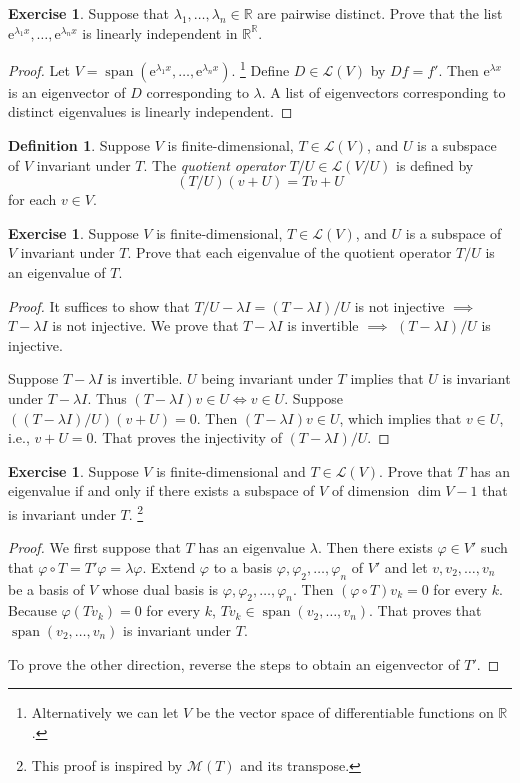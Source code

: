 \documentclass{tufte-handout}
\theoremstyle{plain} %
\theoremstyle{definition}
\newtheorem{defn}[thm]{Definition}
\newtheorem{exer}[thm]{Exercise}
\theoremstyle{remark}
\renewcommand{\phi}{\varphi}
\newcommand{\R}{\mathbb{R}}
\renewcommand{\L}{\mathcal{L}}
\newcommand{\M}{\mathcal{M}}
\newcommand{\e}{\mathrm{e}}
\DeclareMathOperator{\spn}{span}
\begin{document}
\begin{exer}
	Suppose that $\lambda_1,\dots,\lambda_n\in\R$ are pairwise distinct. Prove that the list $\e^{\lambda_1x},\dots,\e^{\lambda_nx}$ is linearly independent in $\R^\R$.
\end{exer}
\begin{proof}
	Let $V=\spn(\e^{\lambda_1x},\dots,\e^{\lambda_nx})$.%
	\footnote{Alternatively we can let $V$ be the vector space of differentiable functions on $\R$.}
	Define $D\in\L(V)$ by $Df=f'$. Then $\e^{\lambda x}$ is an eigenvector of $D$ corresponding to $\lambda$. A list of eigenvectors corresponding to distinct eigenvalues is linearly independent.
\end{proof}

\begin{defn}
	Suppose $V$ is finite-dimensional, $T\in\L(V)$, and $U$ is a subspace of $V$ invariant under $T$. The \emph{quotient operator} $T/U\in\L(V/U)$ is defined by
	\[(T/U)(v+U)=Tv+U\]
	for each $v\in V$.
\end{defn}

\begin{exer}
	Suppose $V$ is finite-dimensional, $T\in\L(V)$, and $U$ is a subspace of $V$ invariant under $T$. Prove that each eigenvalue of the quotient operator $T/U$ is an eigenvalue of $T$.
\end{exer}
\begin{proof}
	It suffices to show that $T/U-\lambda I=(T-\lambda I)/U$ is not injective $\implies$ $T-\lambda I$ is not injective. We prove that $T-\lambda I$ is invertible $\implies$ $(T-\lambda I)/U$ is injective.

	Suppose $T-\lambda I$ is invertible. $U$ being invariant under $T$ implies that $U$ is invariant under $T-\lambda I$. Thus $(T-\lambda I)v\in U\iff v\in U$. Suppose $((T-\lambda I)/U)(v+U)=0$. Then $(T-\lambda I)v\in U$, which implies that $v\in U$, i.e., $v+U=0$. That proves the injectivity of $(T-\lambda I)/U$.
\end{proof}

\begin{exer}
	Suppose $V$ is finite-dimensional and $T\in\L(V)$. Prove that $T$ has an eigenvalue if and only if there exists a subspace of $V$ of dimension $\dim V-1$ that is invariant under $T$.%
	\footnote{This proof is inspired by $\M(T)$ and its transpose.}
\end{exer}
\begin{proof}
	We first suppose that $T$ has an eigenvalue $\lambda$. Then there exists $\phi\in V'$ such that $\phi\circ T=T'\phi=\lambda\phi$. Extend $\phi$ to a basis $\phi,\phi_2,\dots,\phi_n$ of $V'$ and let $v,v_2,\dots,v_n$ be a basis of $V$ whose dual basis is $\phi,\phi_2,\dots,\phi_n$. Then $(\phi\circ T)v_k=0$ for every $k$. Because $\phi(T v_k)=0$ for every $k$, $Tv_k\in\spn(v_2,\dots,v_n)$. That proves that $\spn(v_2,\dots,v_n)$ is invariant under $T$.

	To prove the other direction, reverse the steps to obtain an eigenvector of $T'$.
\end{proof}
\end{document}
